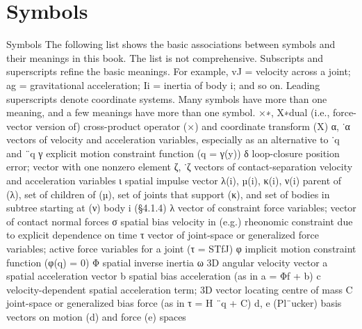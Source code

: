 \chapter*{Symbols}
Symbols The following list shows the basic associations between symbols and their meanings in this book. The list is not comprehensive. Subscripts and superscripts refine the basic meanings. For example, vJ = velocity across a joint; ag = gravitational acceleration; Ii = inertia of body i; and so on. Leading superscripts denote coordinate systems. Many symbols have more than one meaning, and a few meanings have more than one symbol. ×∗, X∗dual (i.e., force-vector version of) cross-product operator (×) and coordinate transform (X) α, ˙α vectors of velocity and acceleration variables, especially as an alternative to ˙q and ¨q γ explicit motion constraint function (q = γ(y)) δ loop-closure position error; vector with one nonzero element ζ, ˙ζ vectors of contact-separation velocity and acceleration variables ι spatial impulse vector λ(i), µ(i), κ(i), ν(i) parent of (λ), set of children of (µ), set of joints that support (κ), and set of bodies in subtree starting at (ν) body i (§4.1.4) λ vector of constraint force variables; vector of contact normal forces σ spatial bias velocity in (e.g.) rheonomic constraint due to explicit dependence on time τ vector of joint-space or generalized force variables; active force variables for a joint (τ = STfJ) φ implicit motion constraint function (φ(q) = 0) Φ spatial inverse inertia ω 3D angular velocity vector a spatial acceleration vector b spatial bias acceleration (as in a = Φf + b) c velocity-dependent spatial acceleration term; 3D vector locating centre of mass C joint-space or generalized bias force (as in τ = H ¨q + C) d, e (Pl¨ucker) basis vectors on motion (d) and force (e) spaces

